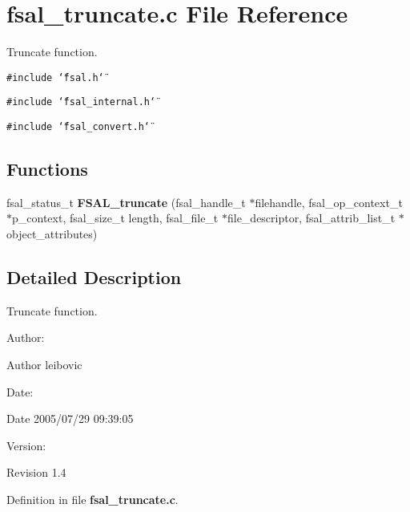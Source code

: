 \section{fsal\_\-truncate.c File Reference}
\label{fsal__truncate_8c}
Truncate function.  


{\tt \#include \char`\"{}fsal.h\char`\"{}}\par
{\tt \#include \char`\"{}fsal\_\-internal.h\char`\"{}}\par
{\tt \#include \char`\"{}fsal\_\-convert.h\char`\"{}}\par
\subsection*{Functions}
\begin{CompactItemize}
\item 
fsal\_\-status\_\-t {\bf FSAL\_\-truncate} (fsal\_\-handle\_\-t $\ast$filehandle, fsal\_\-op\_\-context\_\-t $\ast$p\_\-context, fsal\_\-size\_\-t length, fsal\_\-file\_\-t $\ast$file\_\-descriptor, fsal\_\-attrib\_\-list\_\-t $\ast$object\_\-attributes)
\end{CompactItemize}


\subsection{Detailed Description}
Truncate function. 

\begin{Desc}
\item[Author:]\end{Desc}
\begin{Desc}
\item[Author]leibovic \end{Desc}
\begin{Desc}
\item[Date:]\end{Desc}
\begin{Desc}
\item[Date]2005/07/29 09:39:05 \end{Desc}
\begin{Desc}
\item[Version:]\end{Desc}
\begin{Desc}
\item[Revision]1.4 \end{Desc}


Definition in file {\bf fsal\_\-truncate.c}.

